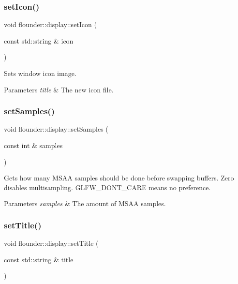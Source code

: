 \subsubsection{\texorpdfstring{set\+Icon()}{setIcon()}}
{\footnotesize\ttfamily void flounder\+::display\+::set\+Icon (\begin{DoxyParamCaption}\item[{const std\+::string \&}]{icon }\end{DoxyParamCaption})}



Sets window icon image. 


\begin{DoxyParams}{Parameters}
{\em title} & The new icon file. \\
\hline
\end{DoxyParams}
\mbox{\label{classflounder_1_1display_ae1bf2028faaf411fedc80ca511a2e739}} 
\subsubsection{\texorpdfstring{set\+Samples()}{setSamples()}}
{\footnotesize\ttfamily void flounder\+::display\+::set\+Samples (\begin{DoxyParamCaption}\item[{const int \&}]{samples }\end{DoxyParamCaption})}



Gets how many M\+S\+AA samples should be done before swapping buffers. Zero disables multisampling. G\+L\+F\+W\+\_\+\+D\+O\+N\+T\+\_\+\+C\+A\+RE means no preference. 


\begin{DoxyParams}{Parameters}
{\em samples} & The amount of M\+S\+AA samples. \\
\hline
\end{DoxyParams}
\mbox{\label{classflounder_1_1display_a48680d3ed1b6842dea7eb5437d6c336f}} 
\subsubsection{\texorpdfstring{set\+Title()}{setTitle()}}
{\footnotesize\ttfamily void flounder\+::display\+::set\+Title (\begin{DoxyParamCaption}\item[{const std\+::string \&}]{title }\end{DoxyParamCaption})}



